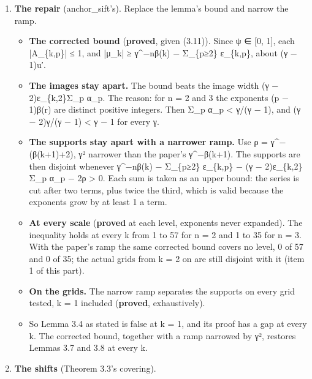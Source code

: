 \begin{enumerate}
\begin{itemize}
\item The proof first bounds (3.11), μ with each α\_\allowbreak{}p cut to its first k terms, α\_\allowbreak{}p − ε\_\allowbreak{}\{k,p\}. That bound holds: its least gap on every grid tested is the last column, at least the margin, and exactly on it at k = 1.
\item It then says the tails Σ\_\allowbreak{}p ε\_\allowbreak{}\{k,p\}A\_\allowbreak{}\{k,p\}, with A\_\allowbreak{}\{k,p\} = ψ(d\_\allowbreak{}p) − ψ(d′\_\allowbreak{}p), are “too small to annihilate” γ\textasciicircum{}−nβ(k). That is true, and it does not keep |μ\_\allowbreak{}k| at or above γ\textasciicircum{}−nβ(k): at k = 1 the tails pull it from 10 units to 9.0999099….
\item So the lemma's bound fails at k = 1. At every k the proof's last step does not prove it.
\end{itemize}
\item \textbf{The repair} (anchor\_\allowbreak{}sift's). Replace the lemma's bound and narrow the ramp.

\begin{itemize}
\item \textbf{The corrected bound} (\textbf{proved}, given (3.11)). Since ψ ∈ [0, 1], each |A\_\allowbreak{}\{k,p\}| ≤ 1, and |μ\_\allowbreak{}k| ≥ γ\textasciicircum{}−nβ(k) − Σ\_\allowbreak{}\{p≥2\} ε\_\allowbreak{}\{k,p\}, about (γ − 1)u′.
\item \textbf{The images stay apart.} The bound beats the image width (γ − 2)ε\_\allowbreak{}\{k,2\}Σ\_\allowbreak{}p α\_\allowbreak{}p. The reason: for n = 2 and 3 the exponents (p − 1)β(r) are distinct positive integers. Then Σ\_\allowbreak{}p α\_\allowbreak{}p < γ/(γ − 1), and (γ − 2)γ/(γ − 1) < γ − 1 for every γ.
\item \textbf{The supports stay apart with a narrower ramp.} Use ρ = γ\textasciicircum{}−(β(k+1)+2), γ² narrower than the paper's γ\textasciicircum{}−β(k+1). The supports are then disjoint whenever γ\textasciicircum{}−nβ(k) − Σ\_\allowbreak{}\{p≥2\} ε\_\allowbreak{}\{k,p\} − (γ − 2)ε\_\allowbreak{}\{k,2\}Σ\_\allowbreak{}p α\_\allowbreak{}p − 2ρ > 0. Each sum is taken as an upper bound: the series is cut after two terms, plus twice the third, which is valid because the exponents grow by at least 1 a term.
\item \textbf{At every scale} (\textbf{proved} at each level, exponents never expanded). The inequality holds at every k from 1 to 57 for n = 2 and 1 to 35 for n = 3. With the paper's ramp the same corrected bound covers no level, 0 of 57 and 0 of 35; the actual grids from k = 2 on are still disjoint with it (item 1 of this part).
\item \textbf{On the grids.} The narrow ramp separates the supports on every grid tested, k = 1 included (\textbf{proved}, exhaustively).
\item So Lemma 3.4 as stated is false at k = 1, and its proof has a gap at every k. The corrected bound, together with a ramp narrowed by γ², restores Lemmas 3.7 and 3.8 at every k.
\end{itemize}
\item \textbf{The shifts} (Theorem 3.3's covering).


\end{enumerate}
